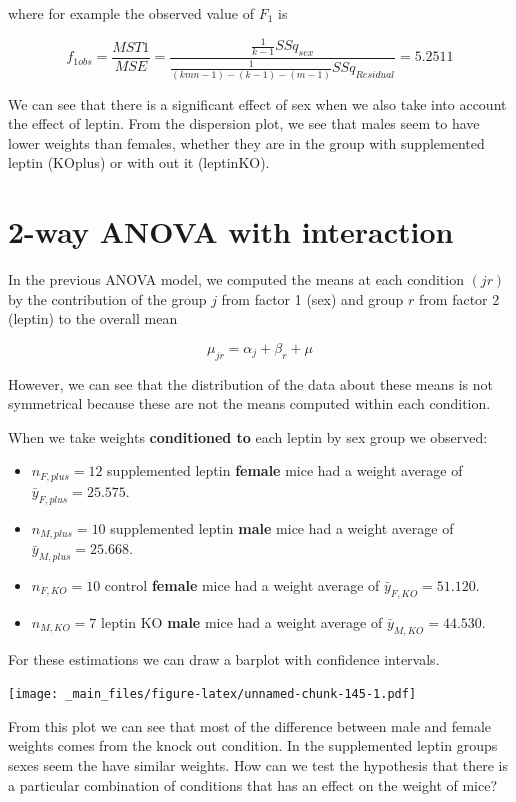 \documentclass[
]{book}
\begin{document}
where for example the observed value of \(F_1\) is

\[f_{1obs}=\frac{MST1}{MSE}=\frac{\frac{1}{k-1}SSq_{sex}}{\frac{1}{(kmn-1)-(k-1)-(m-1)}SSq_{Residual}}=5.2511\]

We can see that there is a significant effect of sex when we also take into account the effect of leptin. From the dispersion plot, we see that males seem to have lower weights than females, whether they are in the group with supplemented leptin (KOplus) or with out it (leptinKO).

\hypertarget{way-anova-with-interaction}{%
\section{2-way ANOVA with interaction}\label{way-anova-with-interaction}}

In the previous ANOVA model, we computed the means at each condition \((jr)\) by the contribution of the group \(j\) from factor 1 (sex) and group \(r\) from factor 2 (leptin) to the overall mean

\[\mu_{jr} = \alpha_{j} + \beta_{r} + \mu\]

However, we can see that the distribution of the data about these means is not symmetrical because these are not the means computed within each condition.

When we take weights \textbf{conditioned to} each leptin by sex group we observed:

\begin{itemize}
\item
  \(n_{F,plus}=12\) supplemented leptin \textbf{female} mice had a weight average of \(\bar{y}_{F,plus}=25.575\).
\item
  \(n_{M,plus}=10\) supplemented leptin \textbf{male} mice had a weight average of \(\bar{y}_{M,plus}=25.668\).
\item
  \(n_{F,KO}=10\) control \textbf{female} mice had a weight average of \(\bar{y}_{F,KO}=51.120\).
\item
  \(n_{M,KO}=7\) leptin KO \textbf{male} mice had a weight average of \(\bar{y}_{M,KO}=44.530\).
\end{itemize}

For these estimations we can draw a barplot with confidence intervals.

\texttt{[image: \_main\_files/figure-latex/unnamed-chunk-145-1.pdf]}

From this plot we can see that most of the difference between male and female weights comes from the knock out condition. In the supplemented leptin groups sexes seem the have similar weights. How can we test the hypothesis that there is a particular combination of conditions that has an effect on the weight of mice?
\end{document}
